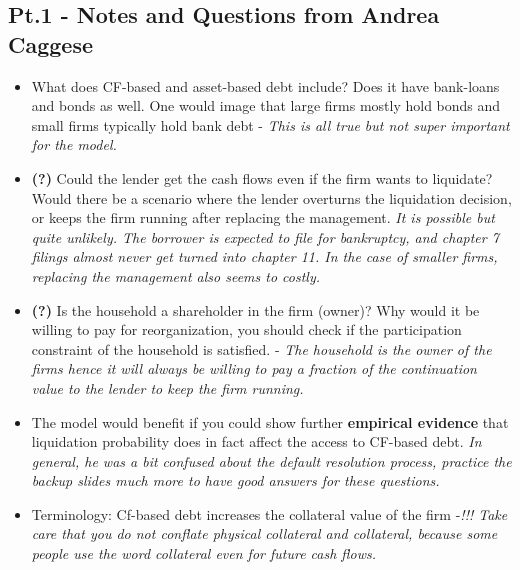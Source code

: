 \documentclass[12pt]{article}
\begin{document}
\subsection*{Pt.1 - Notes and Questions from Andrea Caggese \checkmark}
\begin{itemize} \setlength\itemsep{0em}  \small
    \item What does CF-based and asset-based debt include? Does it have bank-loans and bonds as well. One would image that large firms mostly hold bonds and small firms typically hold bank debt - \textit{This is all true but not super important for the model. }
    \item \textbf{(?)}  Could the lender get the cash flows even if the firm wants to liquidate? Would there be a scenario where the lender overturns the liquidation decision, or keeps the firm running after replacing the management.  \textit{It is possible but quite unlikely. The borrower is expected to file for bankruptcy, and chapter 7 filings almost never get turned into chapter 11. In the case of smaller firms, replacing the management also seems to costly.}
    \item  \textbf{(?)}  Is the household a shareholder in the firm (owner)? Why would it be willing to pay for reorganization, you should check if the participation constraint of the household is satisfied. - \textit{The household is the owner of the firms hence it will always be willing to pay a fraction of the continuation value to the lender to keep the firm running.}
    \item The model would benefit if you could show further \textbf{empirical evidence} that liquidation probability does in fact affect the access to CF-based debt. \textit{In general, he was a bit confused about the default resolution process, practice the backup slides much more to have good answers for these questions.}
    \item Terminology: Cf-based debt increases the collateral value of the firm -\textit{!!! Take care that you do not conflate physical collateral and collateral, because some people use the word collateral even for future cash flows.}
\end{itemize} \normalsize
\end{document}
